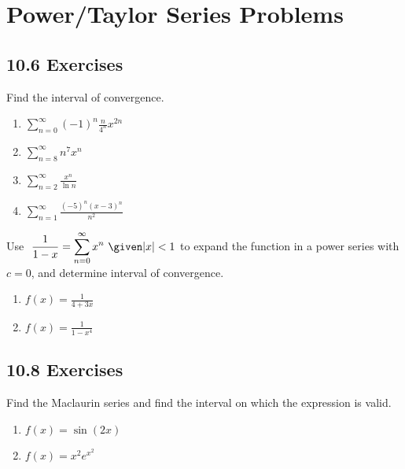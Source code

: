 \section{Power/Taylor Series Problems}

\subsection{10.6 Exercises}
Find the interval of convergence.

\begin{enumerate}[itemsep=24em]
  \item \(\displaystyle \sum_{n=0}^{\infty}  (-1)^n \frac{n}{4^n}x^{2n} \)
  \item \(\displaystyle \sum_{n=8}^{\infty} n^7 x^n \)

\newpage %

  \item \(\displaystyle \sum_{n=2}^{\infty} \frac{x^n}{\ln n} \)
  \item \(\displaystyle \sum_{n=1}^{\infty} \frac{(-5)^n(x-3)^n}{n^2} \)

\end{enumerate}

\newpage %

Use \(~\displaystyle \frac{1}{1-x} = \sum_{n=0}^{\infty} x^n ~\given |x| < 1 \)
to expand the function in a power series with \(c = 0\), and determine interval
of convergence.

\begin{enumerate}[itemsep=24em, resume]

  \item  \(\displaystyle f(x) = \frac{1}{4+3x} \)

  \item  \(\displaystyle f(x) = \frac{1}{1-x^4} \)
\end{enumerate}
\newpage %

\subsection{10.8 Exercises}

Find the Maclaurin series and find the interval on which the expression is
valid.
\begin{enumerate}[itemsep=24em]
  \item \(\displaystyle  f(x) = \sin(2x) \)
  \item \(\displaystyle  f(x) = x^2e^{x^{2} } \)
\end{enumerate}

